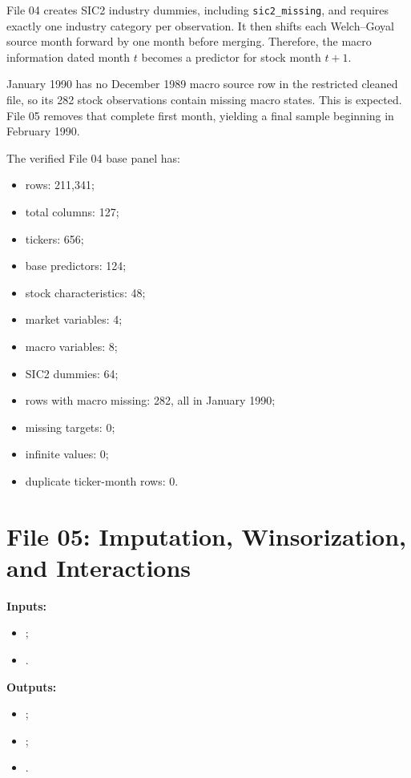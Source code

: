 \documentclass[11pt,a4paper]{article}
\newcommand{\code}[1]{\texttt{#1}}
\begin{document}
File 04 creates SIC2 industry dummies, including \code{sic2\_missing}, and requires exactly one industry category per observation. It then shifts each Welch--Goyal source month forward by one month before merging. Therefore, the macro information dated month $t$ becomes a predictor for stock month $t+1$.

January 1990 has no December 1989 macro source row in the restricted cleaned file, so its 282 stock observations contain missing macro states. This is expected. File 05 removes that complete first month, yielding a final sample beginning in February 1990.

The verified File 04 base panel has:
\begin{itemize}
  \item rows: 211,341;
  \item total columns: 127;
  \item tickers: 656;
  \item base predictors: 124;
  \item stock characteristics: 48;
  \item market variables: 4;
  \item macro variables: 8;
  \item SIC2 dummies: 64;
  \item rows with macro missing: 282, all in January 1990;
  \item missing targets: 0;
  \item infinite values: 0;
  \item duplicate ticker-month rows: 0.
\end{itemize}

\section{File 05: Imputation, Winsorization, and Interactions}

\textbf{Inputs:}
\begin{itemize}
  \item {};
  \item {}.
\end{itemize}

\textbf{Outputs:}
\begin{itemize}
  \item {};
  \item {};
  \item {}.
\end{itemize}
\end{document}

